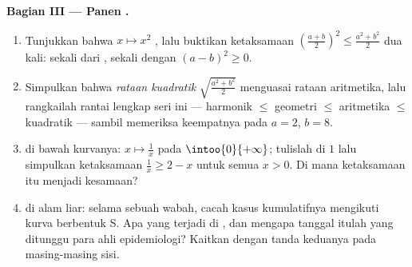 \begin{problem}
\medskip
\noindent\textbf{Bagian III --- Panen .}
\begin{enumerate}[resume]
  \item Tunjukkan bahwa $x \mapsto x^2$ , lalu buktikan
        ketaksamaan 
        $\left(\frac{a + b}{2}\right)^2 \leq
        \frac{a^2 + b^2}{2}$ dua kali: sekali dari , sekali
        dengan  $(a - b)^2 \geq 0$.
  \item Simpulkan bahwa \emph{rataan kuadratik}
        $\sqrt{\frac{a^2 + b^2}{2}}$ menguasai rataan
        aritmetika, lalu rangkailah rantai lengkap seri ini ---
        harmonik $\leq$ geometri $\leq$ aritmetika $\leq$
        kuadratik --- sambil memeriksa keempatnya pada $a = 2$, $b = 8$.
  \item {} di bawah kurvanya: $x \mapsto \frac1x$ 
        pada $\intoo{0}{+\infty}$; tulislah  di $1$ lalu
        simpulkan ketaksamaan
        $\frac1x \geq 2 - x$ untuk semua $x > 0$. Di mana ketaksamaan itu
        menjadi kesamaan?
  \item {} di alam liar: selama sebuah wabah,
        cacah kasus kumulatifnya mengikuti kurva berbentuk S. Apa
        yang terjadi di , dan mengapa tanggal itulah yang
        ditunggu para ahli epidemiologi? Kaitkan dengan tanda
         keduanya pada masing-masing sisi.
\end{enumerate}


\end{problem}

